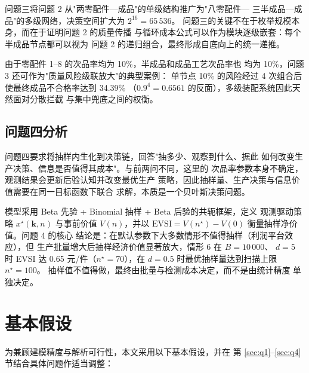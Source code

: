 \documentclass[withoutpreface,bwprint]{cumcmthesis}
\begin{document}
问题三将问题 2 从"两零配件—成品"的单级结构推广为"八零配件—
三半成品—成品"的多级网络，决策空间扩大为 $2^{16} = 65\,536$。
问题三的关键不在于枚举规模本身，而在于证明问题 2 的质量传播
与循环成本公式可以作为模块逐级嵌套：每个半成品节点都可以视为
问题 2 的递归组合，最终形成自底向上的统一递推。

由于零配件 1--8 的次品率均为 10\%，半成品和成品工艺次品率也
均为 10\%，问题 3 还可作为"质量风险级联放大"的典型案例：
单节点 10\% 的风险经过 4 次组合后使最终成品不合格率达到 34.39\%
（$0.9^4 = 0.6561$ 的反面），多级装配系统因此天然面对分散拦截
与集中兜底之间的权衡。

\subsection{问题四分析}

问题四要求将抽样内生化到决策链，回答"抽多少、观察到什么、据此
如何改变生产决策、信息是否值得其成本"。与前两问不同，这里的
次品率参数本身不确定，观测结果会更新后验认知并改变最优生产
策略，因此抽样量、生产决策与信息价值需要在同一目标函数下联合
求解，本质是一个贝叶斯决策问题。

模型采用 Beta 先验 + Binomial 抽样 + Beta 后验的共轭框架，定义
观测驱动策略 $x^\star(\mathbf{k}, n)$ 与事前价值 $V(n)$，并以
$\mathrm{EVSI} = V(n^\star) - V(0)$ 衡量抽样净价值。问题 4 的核心
结论是：在默认参数下大多数情形不值得抽样（利润平台效应），但
生产批量增大后抽样经济价值显著放大，情形 6 在 $B = 10\,000$、
$d = 5$ 时 EVSI 达 0.65 元/件（$n^\star = 70$），在 $d = 0.5$
时最优抽样量达到扫描上限 $n^\star = 100$。
抽样值不值得做，最终由批量与检测成本决定，而不是由统计精度
单独决定。

\section{基本假设}

为兼顾建模精度与解析可行性，本文采用以下基本假设，并在
第 \ref{sec:q1}--\ref{sec:q4} 节结合具体问题作适当调整：
\end{document}
